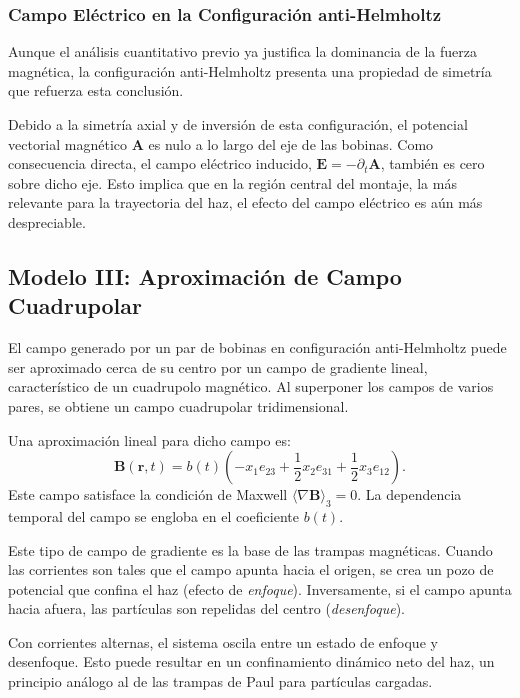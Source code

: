 \subsubsection{Campo Eléctrico en la Configuración anti-Helmholtz}
\label{sssec:campo_electrico_ah}

Aunque el análisis cuantitativo previo ya justifica la dominancia de la
fuerza magnética, la configuración anti-Helmholtz presenta una propiedad
de simetría que refuerza esta conclusión.

Debido a la simetría axial y de inversión de esta configuración, el
potencial vectorial magnético $\boldsymbol{A}$ es nulo a lo largo del eje
de las bobinas. Como consecuencia directa, el campo eléctrico inducido,
$\boldsymbol{E} = -\partial_t \boldsymbol{A}$, también es cero sobre dicho
eje. Esto implica que en la región central del montaje, la más relevante
para la trayectoria del haz, el efecto del campo eléctrico es aún más
despreciable.

\subsection{Modelo III: Aproximación de Campo Cuadrupolar}
\label{ssec:modelo_cuadrupolar}

El campo generado por un par de bobinas en configuración anti-Helmholtz
puede ser aproximado cerca de su centro por un campo de gradiente lineal,
característico de un cuadrupolo magnético. Al superponer los campos de
varios pares, se obtiene un campo cuadrupolar tridimensional.

Una aproximación lineal para dicho campo es:
%
\begin{equation}
	\boldsymbol{B}(\boldsymbol{r}, t) = b(t)
	\left( - x_1 e_{23} + \frac{1}{2} x_2 e_{31} + \frac{1}{2} x_3 e_{12} \right).
	\label{eq:quadrupole_field}
\end{equation}
%
Este campo satisface la condición de Maxwell $\langle \nabla \boldsymbol{B} \rangle_3 = 0$.
La dependencia temporal del campo se engloba en el coeficiente $b(t)$.

Este tipo de campo de gradiente es la base de las trampas magnéticas.
Cuando las corrientes son tales que el campo apunta hacia el origen, se
crea un pozo de potencial que confina el haz (efecto de \emph{enfoque}).
Inversamente, si el campo apunta hacia afuera, las partículas son
repelidas del centro (\emph{desenfoque}).

Con corrientes alternas, el sistema oscila entre un estado de enfoque y
desenfoque. Esto puede resultar en un confinamiento dinámico neto del
haz, un principio análogo al de las trampas de Paul para partículas
cargadas.
